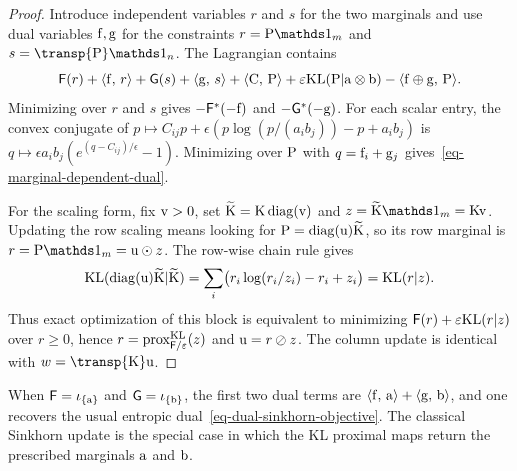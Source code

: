 \begin{proof}
Introduce independent variables $r$ and $s$ for the two marginals and use dual variables $\fD,\gD$ for the constraints $r=\P\ones_m$ and $s=\transp{\P}\ones_n$. The Lagrangian contains
\[
	\mathsf F(r)+\dotp{\fD}{r}
	+
	\mathsf G(s)+\dotp{\gD}{s}
	+
	\dotp{\C}{\P}
	+
	\epsilon\KLD(\P|\a\otimes\b)
	-
	\dotp{\fD\oplus\gD}{\P}.
\]
Minimizing over $r$ and $s$ gives $-\mathsf F^*(-\fD)$ and $-\mathsf G^*(-\gD)$. For each scalar entry, the convex conjugate of $p\mapsto C_{ij}p+\epsilon(p\log(p/(a_i b_j))-p+a_i b_j)$ is $q\mapsto \epsilon a_i b_j(e^{(q-C_{ij})/\epsilon}-1)$. Minimizing over $\P$ with $q=\fD_i+\gD_j$ gives~\eqref{eq-marginal-dependent-dual}.

For the scaling form, fix $\vD>0$, set $\widetilde{\K}=\K\diag(\vD)$ and $z=\widetilde{\K}\ones_m=\K\vD$. Updating the row scaling means looking for $\P=\diag(\uD)\widetilde{\K}$, so its row marginal is $r=\P\ones_m=\uD\odot z$. The row-wise chain rule gives
\[
	\KLD(\diag(\uD)\widetilde{\K}|\widetilde{\K})
	=
	\sum_i \bigl(r_i\log(r_i/z_i)-r_i+z_i\bigr)
	=
	\KLD(r|z).
\]
Thus exact optimization of this block is equivalent to minimizing $\mathsf F(r)+\epsilon\KLD(r|z)$ over $r\geq0$, hence $r=\prox_{\mathsf F/\epsilon}^{\KLD}(z)$ and $\uD=r\oslash z$. The column update is identical with $w=\transp{\K}\uD$.
\end{proof}

When $\mathsf F=\iota_{\{\a\}}$ and $\mathsf G=\iota_{\{\b\}}$, the first two dual terms are $\dotp{\fD}{\a}+\dotp{\gD}{\b}$, and one recovers the usual entropic dual~\eqref{eq-dual-sinkhorn-objective}. The classical Sinkhorn update is the special case in which the KL proximal maps return the prescribed marginals $\a$ and $\b$.

